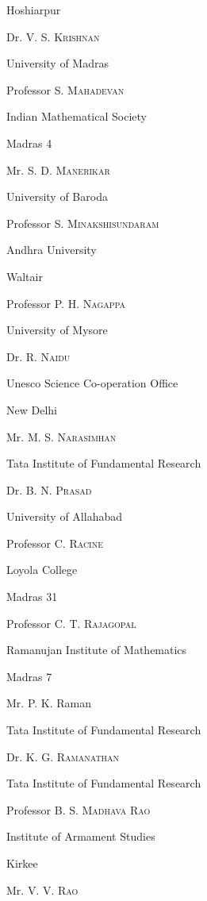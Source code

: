\quad Hoshiarpur
\smallskip

\quad Dr. \textsc{V. S. Krishnan}

\quad University of Madras
\smallskip

\quad Professor \textsc{S. Mahadevan}

\quad Indian Mathematical Society

\quad Madras 4
\smallskip

\quad Mr. \textsc{S. D. Manerikar}

\quad University of Baroda
\smallskip

\quad Professor \textsc{S. Minakshisundaram}

\quad Andhra University

\quad Waltair
\smallskip

\quad Professor \textsc{P. H. Nagappa}

\quad University of Mysore
\smallskip

\quad Dr. \textsc{R. Naidu}

\quad Unesco Science Co-operation Office

\quad New Delhi
\smallskip

\quad Mr. \textsc{M. S. Narasimhan}

\quad Tata Institute of Fundamental Research
\smallskip

\quad Dr. \textsc{B. N. Prasad}

\quad University of Allahabad
\smallskip

\quad Professor \textsc{C. Racine}

\quad Loyola College

\quad Madras 31
\smallskip

\quad Professor \textsc{C. T. Rajagopal}\pageoriginale

\quad Ramanujan Institute of Mathematics

\quad Madras 7
\smallskip

\quad Mr. P. K. Raman

\quad Tata Institute of Fundamental Research
\smallskip

\quad Dr. \textsc{K. G. Ramanathan}

\quad Tata Institute of Fundamental Research
\smallskip

\quad Professor \textsc{B. S. Madhava Rao}

\quad Institute of Armament Studies

\quad Kirkee
\smallskip

\quad Mr. \textsc{V. V. Rao}

